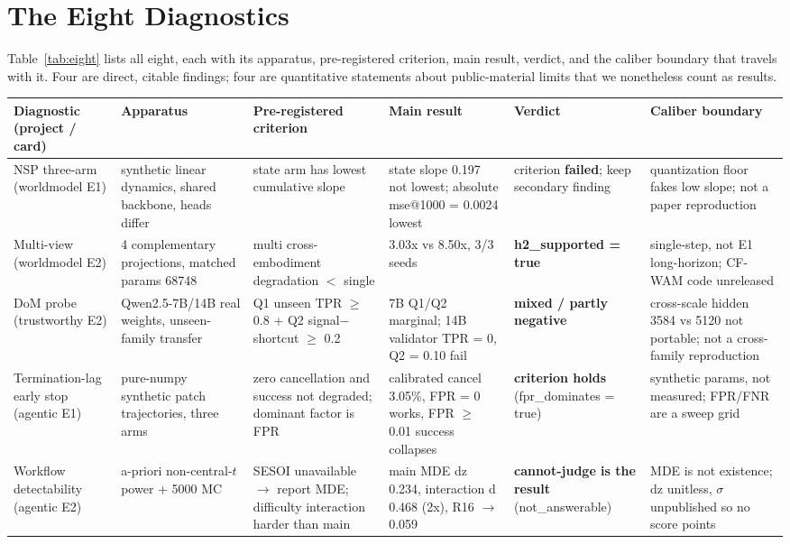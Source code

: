 \section{The Eight Diagnostics}
\label{sec:diagnostics}

Table~\ref{tab:eight} lists all eight, each with its apparatus, pre-registered
criterion, main result, verdict, and the caliber boundary that travels with it.
Four are direct, citable findings; four are quantitative statements about
public-material limits that we nonetheless count as results.

\begin{center}
\scriptsize
\setlength{\tabcolsep}{3.2pt}
\begin{longtable}{@{}p{2.3cm}p{2.5cm}p{2.5cm}p{3.6cm}p{1.85cm}p{2.6cm}@{}}
\toprule
Diagnostic (project / card) & Apparatus & Pre-registered criterion & Main result & Verdict & Caliber boundary \\
\midrule
\endhead
NSP three-arm (worldmodel E1) & synthetic linear dynamics, shared backbone, heads differ & state arm has lowest cumulative slope & state slope 0.197 not lowest; absolute mse@1000 = 0.0024 lowest & criterion \textbf{failed}; keep secondary finding & quantization floor fakes low slope; not a paper reproduction \\
Multi-view (worldmodel E2) & 4 complementary projections, matched params 68748 & multi cross-embodiment degradation $<$ single & 3.03x vs 8.50x, 3/3 seeds & \textbf{h2\_supported = true} & single-step, not E1 long-horizon; CF-WAM code unreleased \\
DoM probe (trustworthy E2) & Qwen2.5-7B/14B real weights, unseen-family transfer & Q1 unseen TPR $\geq$ 0.8 + Q2 signal$-$shortcut $\geq$ 0.2 & 7B Q1/Q2 marginal; 14B validator TPR = 0, Q2 = 0.10 fail & \textbf{mixed / partly negative} & cross-scale hidden 3584 vs 5120 not portable; not a cross-family reproduction \\
Termination-lag early stop (agentic E1) & pure-numpy synthetic patch trajectories, three arms & zero cancellation and success not degraded; dominant factor is FPR & calibrated cancel 3.05\%, FPR = 0 works, FPR $\geq$ 0.01 success collapses & \textbf{criterion holds} (fpr\_dominates = true) & synthetic params, not measured; FPR/FNR are a sweep grid \\
Workflow detectability (agentic E2) & a-priori non-central-$t$ power + 5000 MC & SESOI unavailable $\rightarrow$ report MDE; difficulty interaction harder than main & main MDE dz 0.234, interaction d 0.468 (2x), R16 $\rightarrow$ 0.059 & \textbf{cannot-judge is the result} (not\_answerable) & MDE is not existence; dz unitless, $\sigma$ unpublished so no score points \\

\end{longtable}
\end{center}
